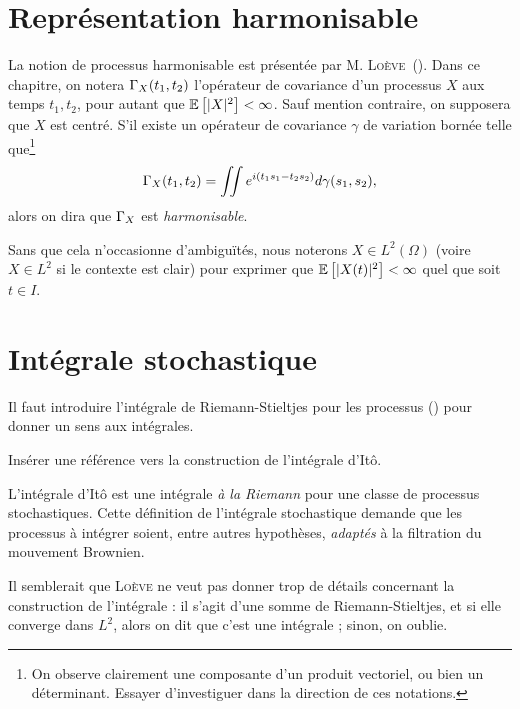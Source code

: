 \section{Représentation harmonisable}

\begin{presentation}
  La notion de processus harmonisable est présentée par
  M. \textsc{Loève}~(\cite{loeve1978}). Dans ce chapitre, on notera
  $\Gamma_X(t_1,t_2)$ l'opérateur de covariance d'un processus $X$ aux
  temps $t_1, t_2$, pour autant que $\mathbb{E}\left[|X|^2\right] < \infty$. Sauf
  mention contraire, on supposera que $X$ est centré. S'il existe un
  opérateur de covariance $\gamma$ de variation bornée telle
  que\footnote{On observe clairement une composante d'un produit
    vectoriel, ou bien un déterminant. Essayer d'investiguer dans la
    direction de ces notations.}
  \[ \Gamma_X(t_1,t_2) = \iint e^{i(t_1s_1 - t_2s_2)} d\gamma(s_1,s_2)
    ,\] alors on dira que $\Gamma_X$ est \emph{harmonisable}.
\end{presentation}

\begin{remarque}
  Sans que cela n'occasionne d'ambiguïtés, nous noterons
  $X\in L^2(\Omega)$ (voire $X\in L^2$ si le contexte est clair) pour
  exprimer que $\mathbb{E}\left[|X(t)|^2\right] < \infty$ quel que soit $t\in I$.
\end{remarque}

\section{Intégrale stochastique}

\begin{prerequis}
  Il faut introduire l'intégrale de Riemann-Stieltjes pour les
  processus (\cite[p.~138]{loeve1978}) pour donner un sens aux
  intégrales.
\end{prerequis}

\begin{alert}
  Insérer une référence vers la construction de l'intégrale d'Itô.
\end{alert}

L'intégrale d'Itô est une intégrale \emph{\og à la Riemann \fg{}} pour
une classe de processus stochastiques. Cette définition de l'intégrale
stochastique demande que les processus à intégrer soient, entre autres
hypothèses, \emph{adaptés} à la filtration du mouvement Brownien.

\begin{alert}
  Il semblerait que \textsc{Loève} ne veut pas donner trop de détails
  concernant la construction de l'intégrale : il s'agit d'une somme de
  Riemann-Stieltjes, et si elle converge dans $L^2$, alors on dit que
  c'est une intégrale ; sinon, on oublie.
\end{alert}

